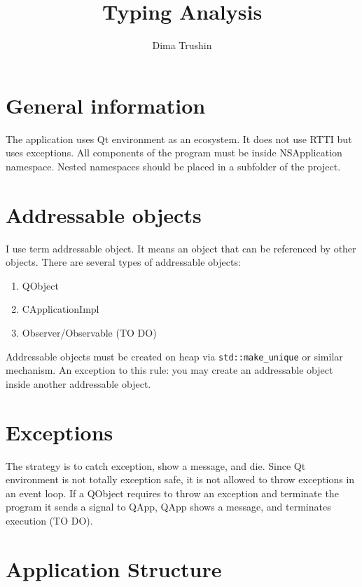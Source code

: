 \documentclass{article}
\begin{document}
\title{Typing Analysis}
\author{Dima Trushin}
\date{}
	
\maketitle
\tableofcontents

\section{General information}

The application uses Qt environment as an ecosystem. It does not use RTTI but uses exceptions. All components of the program must be inside NSApplication namespace. Nested namespaces should be placed in a subfolder of the project.

\section{Addressable objects}

I use term addressable object. It means an object that can be referenced by other objects. There are several types of addressable objects:
\begin{enumerate}
\item QObject
\item CApplicationImpl
\item Observer/Observable (TO DO)
\end{enumerate}
Addressable objects must be created on heap via \verb"std::make_unique" or similar mechanism. An exception to this rule: you may create an addressable object inside another addressable object.

\section{Exceptions}

The strategy is to catch exception, show a message, and die. Since Qt environment is not totally exception safe, it is not allowed to throw exceptions in an event loop. If a QObject requires to throw an exception and terminate the program it sends a signal to QApp, QApp shows a message, and terminates execution (TO DO).

\section{Application Structure}
\end{document}
